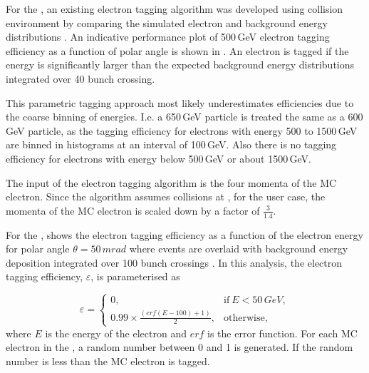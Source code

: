 For the \BeamCAL, an existing electron tagging algorithm was developed using  collision environment by comparing the simulated electron and background energy distributions \cite{Sailer:2017onh}. An indicative performance plot of 500\,GeV electron tagging efficiency as a function of polar angle is shown in . An electron is tagged if the energy is significantly larger than the expected background energy distributions integrated over 40 bunch crossing.

This parametric tagging approach  most likely underestimates efficiencies due to the coarse binning of energies. I.e. a 650\,GeV particle is treated the same as a 600\,GeV particle, as the tagging efficiency for electrons with energy 500 to 1500\,GeV are binned in histograms at an interval of 100\,GeV. Also there is no tagging efficiency for electrons with energy below 500\,GeV or about 1500\,GeV.



The input of the \BeamCAL electron tagging algorithm is the four momenta of the MC electron. Since the algorithm assumes collisions at , for the  user case, the momenta of the MC electron is scaled down by a factor of $\frac{3}{1.4}$.



For the \LumiCAL,   shows the \LumiCAL  electron tagging efficiency as a function of the electron energy for polar angle $\theta = 50\,mrad$ where events are overlaid with background energy deposition integrated over 100 bunch crossings \cite{Lukic:forwardElectron}. In this analysis, the \LumiCAL electron tagging efficiency, $\varepsilon$, is parameterised as




\begin{equation}
\varepsilon=
\begin{cases}
  0, & \text{if}\ E < 50\,GeV,\\
  0.99 \times \frac{(erf(E - 100) + 1 )}{2}, & \text{otherwise},
\end{cases}
\end{equation}
where $E$ is the energy of the electron and $erf$ is the error function. For each MC electron in the \LumiCAL, a random number between 0 and 1 is generated. If the random number is less than \varepsilon the MC electron is tagged.

